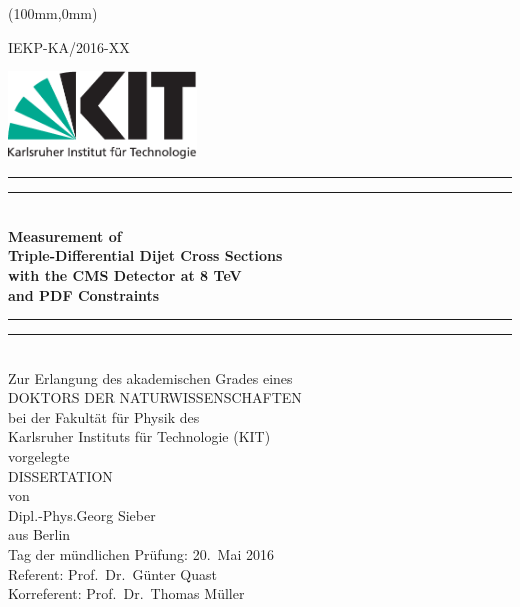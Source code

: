 \begin{titlepage}
    \begin{center}
        \begin{textblock*}{5cm}(100mm,0mm)
            \begin{flushright}
                \small
                IEKP-KA/2016-XX
            \end{flushright}
        \end{textblock*}
        \includegraphics[width=5.0cm]{figures/Kitlogo_de_cmyk}
        \vspace*{2cm}

        \vspace*{\baselineskip}
        \rule{\textwidth}{1.6pt}\vspace*{-\baselineskip}\vspace*{2pt}
        \rule{\textwidth}{0.4pt}\\[\baselineskip]
        \LARGE{\textbf{Measurement of\\
            Triple-Differential Dijet Cross Sections\\
            with the CMS Detector at 8 TeV\\
        and PDF Constraints}}\\
        \rule{\textwidth}{0.4pt}\vspace*{-\baselineskip}\vspace{3.2pt}
        \rule{\textwidth}{1.6pt}\\[\baselineskip]
        \vspace{6ex}
        \large Zur Erlangung des akademischen Grades eines\\[2.5ex]
        \textsc{DOKTORS DER NATURWISSENSCHAFTEN}\\[2.5ex]
            bei der Fakult\"at f\"ur Physik des\\
        Karlsruher Instituts f\"ur Technologie (KIT)\\ 
        vorgelegte\\
        \vspace{2.5ex}
        \textsc{DISSERTATION}\\
        \vspace{2.5ex}
        von\\
        \vspace{2ex}
        Dipl.-Phys.\;Georg Sieber\\
        aus Berlin\\

\vspace{\fill}
Tag der mündlichen Prüfung: 20.\ Mai 2016\\[1.5ex]
Referent: Prof.\ Dr.\ Günter Quast\\[0.5ex]
Korreferent: Prof.\ Dr.\ Thomas Müller
    \end{center}
\end{titlepage}
\cleardoublepage
